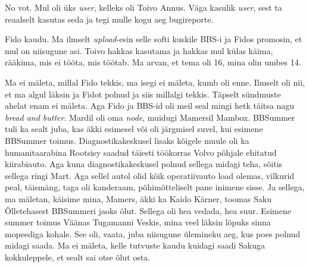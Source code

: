 
No vot. Mul oli üks \emph{user}, kelleks oli Toivo Annus. Väga kasulik \emph{user}, sest ta reaalselt kasutas seda ja tegi  mulle kogu aeg bugireporte.


Fido kaudu. Ma ilmselt \emph{upload}-esin selle softi kuskile BBS-i ja Fidos promosin, et mul on niisugune asi. Toivo hakkas kasutama ja hakkas mul külas käima, rääkima, mis ei tööta, mis töötab. Ma arvan, et tema oli 16, mina olin umbes 14. 


Ma ei mäleta, millal Fido tekkis, ma isegi ei mäleta, kumb oli enne. Ilmselt oli nii, et ma algul läksin ja Fidot polnud ja siis millalgi tekkis. Täpselt sündmuste ahelat enam ei mäleta. Aga Fido ja BBS-id oli meil seal mingi hetk täitsa nagu \emph{bread and butter}. Mardil oli oma \emph{node}, muidugi Mamersil Mambox. BBSummer tuli ka sealt juba, kas äkki esimesel või oli järgmisel suvel, kui esimene BBSummer toimus. Diagnostikakeskusel lisaks kõigele muule oli ka humanitaarabina Rootsisy saadud täiesti töökorras Volvo põhjale ehitatud kiirabiauto. Aga kuna diagnostikakeskusel polnud sellega midagi teha, sõitis sellega ringi Mart. Aga sellel autol olid kõik  operatiivauto load olemas, vilkurid peal, täismäng, taga oli kanderaam, põhimõtteliselt pane inimene sisse. Ja sellega, ma mäletan, käisime mina, Mamers, äkki ka Kaido Kärner, toomas Saku Õlletehasest BBSummeri jaoks õlut. Sellega oli hea vedada, hea suur. Esimene summer toimus Väänas Tugamanni Veskis, mina veel läksin lõpuks sinna mopeediga kohale. See oli, vaata, juba niisugune ülemineku aeg, kus poes polnud midagi saada. Ma ei mäleta, kelle tutvuste kaudu kuidagi saadi Sakuga kokkuleppele, et sealt sai otse õlut osta. 


